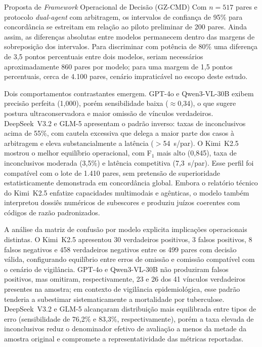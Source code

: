 \begin{chapter}{Proposta de \textit{Framework} Operacional de Decisão (GZ-CMD)}
Com $n=517$ pares e protocolo \textit{dual-agent} com arbitragem, os intervalos de confiança de 95\% para concordância se estreitam em relação ao piloto preliminar de 200 pares. Ainda assim, as diferenças absolutas entre modelos permanecem dentro das margens de sobreposição dos intervalos. Para discriminar com potência de 80\% uma diferença de 3,5 pontos percentuais entre dois modelos, seriam necessários aproximadamente 860 pares por modelo; para uma margem de 1,5 pontos percentuais, cerca de 4.100 pares, cenário impraticável no escopo deste estudo.

Dois comportamentos contrastantes emergem. GPT-4o e Qwen3-VL-30B exibem precisão perfeita (1,000), porém sensibilidade baixa ($\approx$0,34), o que sugere postura ultraconservadora e maior omissão de vínculos verdadeiros. DeepSeek~V3.2 e GLM-5 apresentam o padrão inverso: taxas de inconclusivos acima de 55\%, com cautela excessiva que delega a maior parte dos casos à arbitragem e eleva substancialmente a latência ($>$54~s/par). O Kimi~K2.5 \cite{KimiK2_5_2025} mostrou o melhor equilíbrio operacional, com F$_1$ mais alto (0,845), taxa de inconclusivos moderada (3,5\%) e latência competitiva (7,3~s/par). Esse perfil foi compatível com o lote de 1.410 pares, sem pretensão de superioridade estatisticamente demonstrada em concordância global. Embora o relatório técnico do Kimi~K2.5 enfatize capacidades multimodais e agênticas, o modelo também interpretou dossiês numéricos de subescores e produziu juízos coerentes com códigos de razão padronizados.

A análise da matriz de confusão por modelo explicita implicações operacionais distintas. O Kimi~K2.5 apresentou 30 verdadeiros positivos, 3 falsos positivos, 8 falsos negativos e 458 verdadeiros negativos entre os 499 pares com decisão válida, configurando equilíbrio entre erros de omissão e comissão compatível com o cenário de vigilância. GPT-4o e Qwen3-VL-30B não produziram falsos positivos, mas omitiram, respectivamente, 23 e 26 dos 41 vínculos verdadeiros presentes na amostra; em contexto de vigilância epidemiológica, esse padrão tenderia a subestimar sistematicamente a mortalidade por tuberculose. DeepSeek~V3.2 e GLM-5 alcançaram distribuição mais equilibrada entre tipos de erro (sensibilidade de 76,2\% e 83,3\%, respectivamente), porém a taxa elevada de inconclusivos reduz o denominador efetivo de avaliação a menos da metade da amostra original e compromete a representatividade das métricas reportadas.


\end{chapter}
